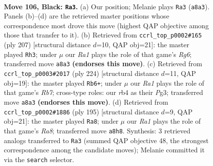 \documentclass[11pt]{article}
\begin{document}
\clearpage

\begin{figure}[p]\centering
\begin{subfigure}{0.46\textwidth}\centering
\resizebox{\linewidth}{!}{%
\newchessgame
\chessboard[
  setfen={r7/3k4/4p1R1/8/1R2PP2/8/5K2/8 b - - 4 106},
  showmover=false,
  pgfstyle=straightmove, color=movearrow, markmove={a8-a3}
]}
\caption{}
\end{subfigure}\hfill
\begin{subfigure}{0.46\textwidth}\centering
\resizebox{\linewidth}{!}{%
\newchessgame
\chessboard[
  setfen={8/8/1kp5/8/PPR5/6r1/1K6/8 b - - 2 104},
  showmover=false,
  pgfstyle=straightmove, color=movearrow, markmove={g3-h3}
]}
\caption{}
\end{subfigure}
\\[4pt]
\begin{subfigure}{0.46\textwidth}\centering
\resizebox{\linewidth}{!}{%
\newchessgame
\chessboard[
  setfen={8/1R6/6k1/4p3/8/3r1PPK/8/8 w - - 37 113},
  showmover=false,
  pgfstyle=straightmove, color=movearrow, markmove={b7-b6}
]}
\caption{}
\end{subfigure}\hfill
\begin{subfigure}{0.46\textwidth}\centering
\resizebox{\linewidth}{!}{%
\newchessgame
\chessboard[
  setfen={8/8/6k1/4R1p1/6P1/8/5PK1/r7 b - - 26 98},
  showmover=false,
  pgfstyle=straightmove, color=movearrow, markmove={a1-a8}
]}
\caption{}
\end{subfigure}
\caption{\textbf{Move 106, Black: \texttt{Ra3}.} (a) Our position; Melanie plays \texttt{Ra3} (\texttt{a8a3}). Panels (b)--(d) are the retrieved master positions whose correspondence most drove this move (highest QAP objective among those that transfer to it). (b) Retrieved from \texttt{ccrl\_top\_p0002\#165} (ply 207) [structural distance $d$=10, QAP obj=21]: the master played \texttt{Rh3}; under $\mu$ our \emph{Ra1} plays the role of that game's \emph{Rg6}; transferred move \texttt{a8a3} \textbf{(endorses this move)}. (c) Retrieved from \texttt{ccrl\_top\_p0003\#2017} (ply 224) [structural distance $d$=11, QAP obj=19]: the master played \texttt{Rb6+}; under $\mu$ our \emph{Ra1} plays the role of that game's \emph{Rb7}; cross-type roles: our \emph{r}b4 as their \emph{P}g3; transferred move \texttt{a8a3} \textbf{(endorses this move)}. (d) Retrieved from \texttt{ccrl\_top\_p0002\#1886} (ply 195) [structural distance $d$=9, QAP obj=21]: the master played \texttt{Ra8}; under $\mu$ our \emph{Ra1} plays the role of that game's \emph{Ra8}; transferred move \texttt{a8h8}. Synthesis: 3 retrieved analogs transferred to \texttt{Ra3} (summed QAP objective 48, the strongest correspondence among the candidate moves); Melanie committed it via the \texttt{search} selector.}
\label{fig:thought-m211}
\end{figure}
\end{document}
